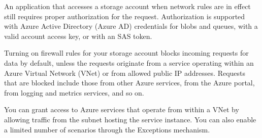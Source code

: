 An application that accesses a storage account when network rules are in effect still requires proper authorization for the request. Authorization is supported with Azure Active Directory (Azure AD) credentials for blobs and queues, with a valid account access key, or with an SAS token.

Turning on firewall rules for your storage account blocks incoming requests for data by default, unless the requests originate from a service operating within an Azure Virtual Network (VNet) or from allowed public IP addresses. Requests that are blocked include those from other Azure services, from the Azure portal, from logging and metrics services, and so on.

You can grant access to Azure services that operate from within a VNet by allowing traffic from the subnet hosting the service instance. You can also enable a limited number of scenarios through the Exceptions mechanism.

\begin{tabular}{c c p{6cm}}

\end{tabular}